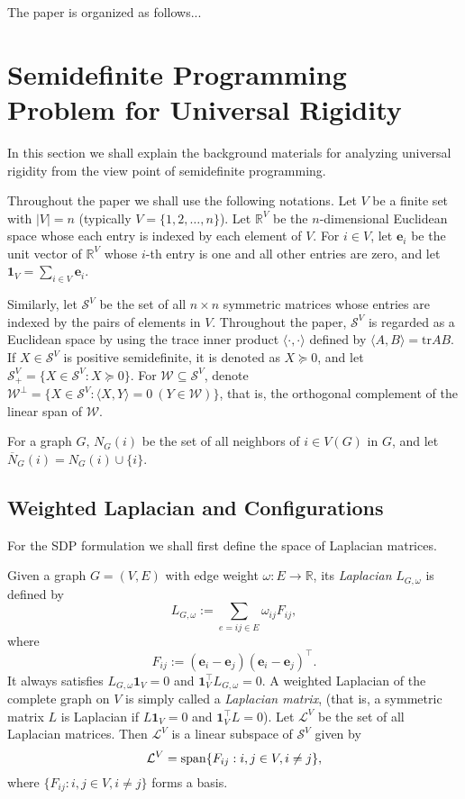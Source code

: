 \documentclass[11pt]{article}
\theoremstyle{definition}
\begin{document}
The paper is organized as follows...

  
\section{Semidefinite Programming Problem for Universal Rigidity}
In this section we shall explain the background materials for analyzing universal rigidity from the view point of semidefinite programming.

Throughout the paper we shall use the following notations.
Let $V$ be a finite set with $|V|=n$ (typically $V=\{1,2,\dots, n\}$).
Let $\mathbb{R}^V$ be the $n$-dimensional Euclidean space whose each entry is indexed by each element of $V$.
For $i\in V$, let $\bm{e}_i$ be the unit vector of $\mathbb{R}^V$ whose $i$-th entry is one and all other entries are zero,
and let ${\bm 1}_V=\sum_{i\in V} \bm{e}_i$.

Similarly, let $\mathcal{S}^V$ be the set of all $n \times n$ symmetric matrices whose entries are indexed by the pairs of elements in $V$. Throughout the paper, $\mathcal{S}^V$ is regarded as a Euclidean space by using the trace inner product $\langle \cdot , \cdot \rangle$ defined by $\langle A,B \rangle=\text{tr}AB$.
If $X \in \mathcal{S}^V$ is positive semidefinite, it is denoted as $X \succeq 0$,
and let $\mathcal{S}^V_+=\{ X \in \mathcal{S}^V: X\succeq 0\}$.
For $\mathcal{W}\subseteq \mathcal{S}^V$, denote $\mathcal{W}^{\bot}=\{X\in \mathcal{S}^V: \langle X, Y\rangle=0 \ (Y\in \mathcal{W})\}$, that is, the orthogonal complement of the linear span of $\mathcal{W}$. 
%

For a graph $G$, $N_G(i)$ be the set of all neighbors of $i\in V(G)$ in $G$, and let $\overline{N}_G(i)=N_G(i)\cup \{i\}$.




\subsection{Weighted Laplacian and Configurations}
For the SDP formulation we shall first define the space of Laplacian matrices. 

Given a graph $G=(V,E)$ with edge weight $\omega:E\rightarrow \mathbb{R}$, its {\em Laplacian} $L_{G,\omega}$ is 
defined by 
\[
L_{G,\omega}:=\sum_{e=ij\in E} \omega_{ij} F_{ij},
\]
where
\[
F_{ij}:=(\bm{e}_i-\bm{e}_j)(\bm{e}_i-\bm{e}_j)^\top.
\]
It always satisfies $L_{G,\omega}{\bm 1}_V=0$ and ${\bm 1}_V^{\top} L_{G,\omega}=0$.
A weighted Laplacian of the complete graph on $V$ is simply called a {\em Laplacian matrix}, (that is, a symmetric matrix $L$ is Laplacian if $L{\bm 1}_V=0$ and ${\bm 1}_V^{\top} L=0$).
Let $\mathcal{L}^V$ be the set of all Laplacian matrices. Then $\mathcal{L}^V$ is a linear subspace of $\mathcal{S}^V$ given by
\[
\mathcal{L}^V={\rm span}\{F_{ij}: i,j\in V, i\neq j\},
\]
where $\{F_{ij}: i,j\in V, i\neq j\}$ forms a basis.
\end{document}
